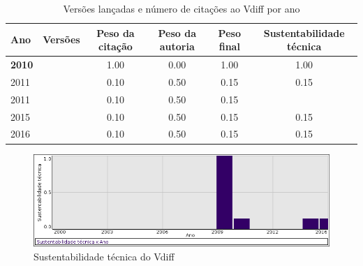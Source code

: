 \begin{table}[H]
\caption{Versões lançadas e número de citações ao Vdiff por ano}
\centering
\begin{tabular}{| l | c | c | c | c | c |}
  \hline
  Ano & Versões & Peso da citação & Peso da autoria & Peso final & Sustentabilidade técnica \\
  \hline
            {\bf 2010}
          &
          
          &
          1.00
          &
          0.00
          &
          1.00
          &
            {\color{blue} 1.00}
          \\
\hline
            2011
          &
          
          &
          0.10
          &
          0.50
          &
          0.15
          &
            {\color{red} 0.15}
          \\
            2011
          &
          
          &
          0.10
          &
          0.50
          &
          0.15
          &
          \\
\hline
            2015
          &
          
          &
          0.10
          &
          0.50
          &
          0.15
          &
            {\color{red} 0.15}
          \\
\hline
            2016
          &
          
          &
          0.10
          &
          0.50
          &
          0.15
          &
            {\color{red} 0.15}
          \\
\hline
\end{tabular}
\end{table}

\begin{figure}[h]
  \center
  \includegraphics[scale=0.50]{imagens/softwares-charts/vdiff.png}
  \caption{Sustentabilidade técnica do Vdiff}
\end{figure}


